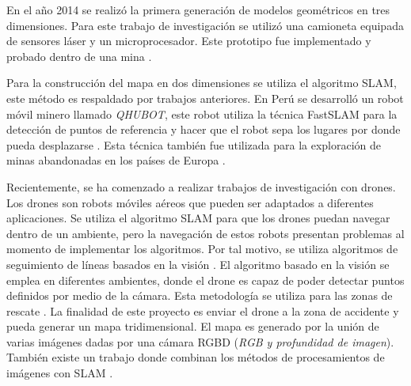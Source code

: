 En el año 2014 se realizó la primera generación de modelos geométricos en tres
dimensiones. Para este trabajo de investigación se utilizó una camioneta equipada de 
sensores láser y un microprocesador. Este prototipo fue implementado y probado dentro 
de una mina \cite{Zlot2014}.

Para la construcción del mapa en dos dimensiones se utiliza el algoritmo SLAM, este 
método es respaldado por trabajos anteriores. En Perú se desarrolló un robot móvil minero
llamado \textit{QHUBOT}, este robot utiliza la técnica FastSLAM para la detección de puntos
de referencia y hacer que el robot sepa los lugares por donde pueda desplazarse 
\cite{Mauricio2015}. Esta técnica también fue utilizada para la exploración de minas 
abandonadas en los países de Europa \cite{Thrun2004}.


Recientemente, se ha comenzado a realizar trabajos de investigación con drones. Los drones 
son robots móviles aéreos que pueden ser adaptados a diferentes aplicaciones. Se utiliza 
el algoritmo SLAM para que los drones puedan navegar dentro de un ambiente, pero la navegación
de estos robots presentan problemas al momento de implementar los algoritmos. Por tal motivo,
se utiliza algoritmos de seguimiento de líneas basados en la visión \cite{Verschoor2013}. El
algoritmo basado en la visión se emplea en diferentes ambientes, donde el drone es capaz de 
poder detectar puntos definidos por medio de la cámara. Esta metodología se utiliza para
las zonas de rescate \cite{Skoda2015}. La finalidad de este proyecto es enviar el drone a la
zona de accidente y pueda generar un mapa tridimensional. El mapa es generado por la unión de
varias imágenes dadas por una cámara RGBD (\textit{RGB y profundidad de imagen}). También existe
un trabajo donde combinan los métodos de procesamientos de imágenes con SLAM \cite{Heukels2015}.

